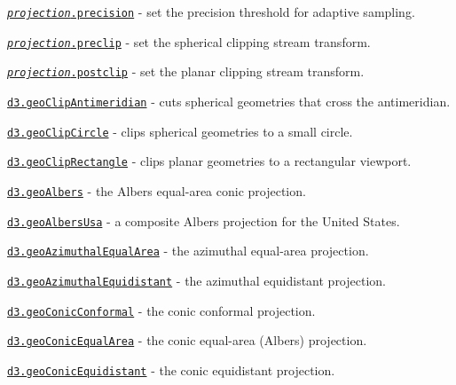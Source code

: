 \begin{DoxyItemize}
\item \href{https://github.com/d3/d3-geo/blob/master/README.md#projection_precision}{\tt {\itshape projection}.precision} -\/ set the precision threshold for adaptive sampling.
\item \href{https://github.com/d3/d3-geo/blob/master/README.md#projection.preclip}{\tt {\itshape projection}.preclip} -\/ set the spherical clipping stream transform.
\item \href{https://github.com/d3/d3-geo/blob/master/README.md#projection.postclip}{\tt {\itshape projection}.postclip} -\/ set the planar clipping stream transform.
\item \href{https://github.com/d3/d3-geo/blob/master/README.md#geoClipAntimeridian}{\tt d3.\+geo\+Clip\+Antimeridian} -\/ cuts spherical geometries that cross the antimeridian.
\item \href{https://github.com/d3/d3-geo/blob/master/README.md#geoClipCircle}{\tt d3.\+geo\+Clip\+Circle} -\/ clips spherical geometries to a small circle.
\item \href{https://github.com/d3/d3-geo/blob/master/README.md#geoClipRectangle}{\tt d3.\+geo\+Clip\+Rectangle} -\/ clips planar geometries to a rectangular viewport.
\item \href{https://github.com/d3/d3-geo/blob/master/README.md#geoAlbers}{\tt d3.\+geo\+Albers} -\/ the Albers equal-\/area conic projection.
\item \href{https://github.com/d3/d3-geo/blob/master/README.md#geoAlbersUsa}{\tt d3.\+geo\+Albers\+Usa} -\/ a composite Albers projection for the United States.
\item \href{https://github.com/d3/d3-geo/blob/master/README.md#geoAzimuthalEqualArea}{\tt d3.\+geo\+Azimuthal\+Equal\+Area} -\/ the azimuthal equal-\/area projection.
\item \href{https://github.com/d3/d3-geo/blob/master/README.md#geoAzimuthalEquidistant}{\tt d3.\+geo\+Azimuthal\+Equidistant} -\/ the azimuthal equidistant projection.
\item \href{https://github.com/d3/d3-geo/blob/master/README.md#geoConicConformal}{\tt d3.\+geo\+Conic\+Conformal} -\/ the conic conformal projection.
\item \href{https://github.com/d3/d3-geo/blob/master/README.md#geoConicEqualArea}{\tt d3.\+geo\+Conic\+Equal\+Area} -\/ the conic equal-\/area (Albers) projection.
\item \href{https://github.com/d3/d3-geo/blob/master/README.md#geoConicEquidistant}{\tt d3.\+geo\+Conic\+Equidistant} -\/ the conic equidistant projection.

\end{DoxyItemize}
